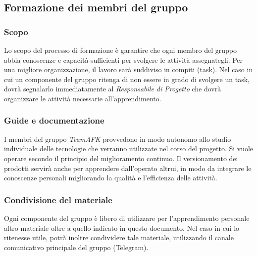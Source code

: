 \subsection{Formazione dei membri del gruppo}
\subsubsection{Scopo}
Lo scopo del processo di formazione è garantire che ogni membro del gruppo abbia conoscenze e capacità sufficienti per svolgere le attività assegnategli. Per una migliore organizzazione, il lavoro sarà suddiviso in compiti (task). Nel caso in cui un componente del gruppo ritenga di non essere in grado di svolgere un task, dovrà segnalarlo immediatamente al \textit{Responsabile di Progetto} che dovrà organizzare le attività necessarie all'apprendimento.

\subsubsection{Guide e documentazione}
I membri del gruppo \textit{TeamAFK} provvedono in modo autonomo allo studio individuale delle tecnologie che verranno utilizzate nel corso del progetto. Si vuole operare secondo il principio del miglioramento continuo. Il versionamento dei prodotti servirà anche per apprendere dall'operato altrui, in modo da integrare le conoscenze personali migliorando la qualità e l'efficienza delle
attività.

\subsubsection{Condivisione del materiale}
Ogni componente del gruppo è libero di utilizzare per l'apprendimento personale altro materiale oltre a quello indicato in questo documento. Nel caso in cui lo ritenesse utile, potrà inoltre condividere tale materiale, utilizzando il canale comunicativo principale del gruppo (Telegram).